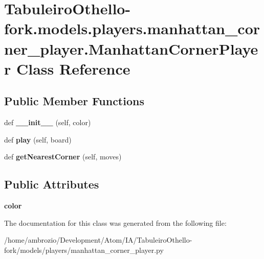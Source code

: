 \hypertarget{class_tabuleiro_othello-fork_1_1models_1_1players_1_1manhattan__corner__player_1_1_manhattan_corner_player}{}\section{Tabuleiro\+Othello-\/fork.models.\+players.\+manhattan\+\_\+corner\+\_\+player.\+Manhattan\+Corner\+Player Class Reference}
\label{class_tabuleiro_othello-fork_1_1models_1_1players_1_1manhattan__corner__player_1_1_manhattan_corner_player}
\subsection*{Public Member Functions}
\begin{DoxyCompactItemize}
\item 
\hypertarget{class_tabuleiro_othello-fork_1_1models_1_1players_1_1manhattan__corner__player_1_1_manhattan_corner_player_a3aa3ecc93f83d67e6d2df577948db647}{}def {\bfseries \+\_\+\+\_\+init\+\_\+\+\_\+} (self, color)\label{class_tabuleiro_othello-fork_1_1models_1_1players_1_1manhattan__corner__player_1_1_manhattan_corner_player_a3aa3ecc93f83d67e6d2df577948db647}

\item 
\hypertarget{class_tabuleiro_othello-fork_1_1models_1_1players_1_1manhattan__corner__player_1_1_manhattan_corner_player_a3044a9ec92f9c175462169019c3f3dfd}{}def {\bfseries play} (self, board)\label{class_tabuleiro_othello-fork_1_1models_1_1players_1_1manhattan__corner__player_1_1_manhattan_corner_player_a3044a9ec92f9c175462169019c3f3dfd}

\item 
\hypertarget{class_tabuleiro_othello-fork_1_1models_1_1players_1_1manhattan__corner__player_1_1_manhattan_corner_player_aa02b9b080d54f90c55a77045112f55e1}{}def {\bfseries get\+Nearest\+Corner} (self, moves)\label{class_tabuleiro_othello-fork_1_1models_1_1players_1_1manhattan__corner__player_1_1_manhattan_corner_player_aa02b9b080d54f90c55a77045112f55e1}

\end{DoxyCompactItemize}
\subsection*{Public Attributes}
\begin{DoxyCompactItemize}
\item 
\hypertarget{class_tabuleiro_othello-fork_1_1models_1_1players_1_1manhattan__corner__player_1_1_manhattan_corner_player_a132bb9fea0aaa07c2e0bf0f6b4b70398}{}{\bfseries color}\label{class_tabuleiro_othello-fork_1_1models_1_1players_1_1manhattan__corner__player_1_1_manhattan_corner_player_a132bb9fea0aaa07c2e0bf0f6b4b70398}

\end{DoxyCompactItemize}


The documentation for this class was generated from the following file\+:\begin{DoxyCompactItemize}
\item 
/home/ambrozio/\+Development/\+Atom/\+I\+A/\+Tabuleiro\+Othello-\/fork/models/players/manhattan\+\_\+corner\+\_\+player.\+py\end{DoxyCompactItemize}
